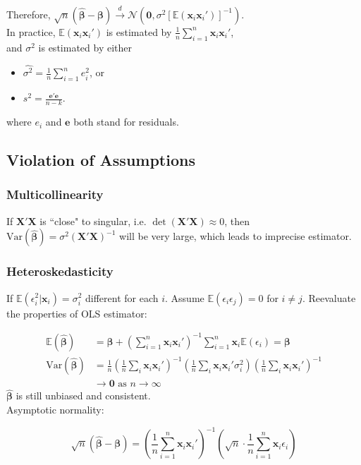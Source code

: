 \documentclass[%
 aip,
 jmp,%
 amsmath,amssymb,
 reprint,%
]{revtex4-1}
\def\N{{\mathbb N}}
\def\b{\beta}
\def\e{\epsilon}
\def\s{\sigma}
\def\E{\mathbb{E}}
\def\N{\mathcal{N}} %
\def\Var{\mathrm{Var}}
\def\dto{\overset{d}{\to}}
\def\h{\hat}
\def\l{\left}
\def\r{\right}
\newcommand{\sumn}[1]{\sum_{i=1}^{n} #1}
\newcommand{\mean}[1]{\frac{1}{n}\sum_{i=1}^{n} #1}
\newcommand{\mat}[1]{\bm{#1}}
\renewcommand{\vec}[1]{\bm{#1}}
\begin{document}
Therefore, $\sqrt{n}(\vec{\h\b}-\vec{\b}) \dto \N(\vec 0, \s^2 [\E(\vec x_i \vec x_i')]^{-1})$. \\

In practice, $\E(\vec x_i \vec x_i')$ is estimated by $\mean \vec x_i \vec x_i'$, \\
and $\s^2$ is estimated by either
    \begin{itemize}
        \item $\h{\s^2} = \mean e_i^2$, or
        \item $s^2 = \frac{\vec e' \vec e}{n - k}$.
    \end{itemize}
where $e_i$ and $\vec e$ both stand for residuals.


\subsection{Violation of Assumptions}

\subsubsection{Multicollinearity}
If $\mat X' \mat X$ is ``close" to singular, i.e. $\det(\mat X'\mat X)\approx 0$, then $\Var (\vec{\h\b}) = \s^2 (\mat X' \mat X)^{-1}$ will be very large,
which leads to imprecise estimator.

\subsubsection{Heteroskedasticity}
If $\E(\e_i^2 | \vec x_i) = \s_i^2$ different for each $i$.
Assume $\E(\e_i\e_j) = 0$ for $i\neq j$.
Reevaluate the properties of OLS estimator:

\begin{align*}
    \E(\vec{\h\b}) &=\textstyle \vec\b + \l(\sumn \vec x_i \vec x_i'\r)^{-1} \sumn \vec x_i \E(\e_i) = \vec\b \\
    \Var(\vec{\h\b}) &=\textstyle \frac{1}{n} \l(\frac{1}{n}\sum_i \vec x_i \vec x_i'\r)^{-1} \l(\frac{1}{n}\sum_i \vec x_i \vec x_i' \s_i^2\r) \l(\frac{1}{n}\sum_i \vec x_i \vec x_i'\r)^{-1} \\
    &\to \mat 0 \textrm{ as } n\to\infty
\end{align*}
$\vec{\h\b}$ is still unbiased and consistent.\\

Asymptotic normality:

$$ \sqrt{n}(\vec{\h\b} - \vec{\b}) = \l(\mean \vec x_i \vec x_i'\r)^{-1} \l(\sqrt{n}\cdot \mean \vec x_i \e_i \r) $$
\end{document}
